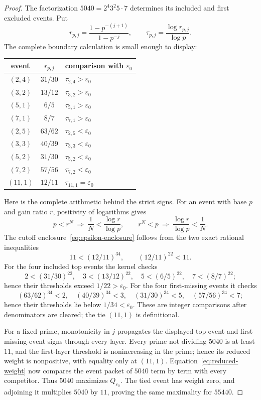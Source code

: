 \documentclass[11pt]{amsart}
\theoremstyle{definition}
\theoremstyle{remark}
\numberwithin{equation}{section}
\newcommand{\eps}{\varepsilon}
\begin{document}
\begin{proof}
The factorization $5040=2^4 3^2 5\cdot7$ determines its included and first
excluded events.  Put
\[
  r_{p,j}=\frac{1-p^{-(j+1)}}{1-p^{-j}},
  \qquad \tau_{p,j}=\frac{\log r_{p,j}}{\log p}.
\]
The complete boundary calculation is small enough to display:
\begin{center}
\begin{tabular}{@{}ccl@{}}
\toprule
event & $r_{p,j}$ & comparison with $\eps_0$ \\
\midrule
$(2,4)$ & $31/30$ & $\tau_{2,4}>\eps_0$ \\
$(3,2)$ & $13/12$ & $\tau_{3,2}>\eps_0$ \\
$(5,1)$ & $6/5$   & $\tau_{5,1}>\eps_0$ \\
$(7,1)$ & $8/7$   & $\tau_{7,1}>\eps_0$ \\
\midrule
$(2,5)$ & $63/62$ & $\tau_{2,5}<\eps_0$ \\
$(3,3)$ & $40/39$ & $\tau_{3,3}<\eps_0$ \\
$(5,2)$ & $31/30$ & $\tau_{5,2}<\eps_0$ \\
$(7,2)$ & $57/56$ & $\tau_{7,2}<\eps_0$ \\
$(11,1)$ & $12/11$ & $\tau_{11,1}=\eps_0$ \\
\bottomrule
\end{tabular}
\end{center}
Here is the complete arithmetic behind the strict signs.  For an event with
base $p$ and gain ratio $r$, positivity of logarithms gives
\[
 p<r^N\ \Longrightarrow\ \frac1N<\frac{\log r}{\log p},
 \qquad
 r^N<p\ \Longrightarrow\ \frac{\log r}{\log p}<\frac1N.
\]
The cutoff enclosure~\eqref{eq:epsilon-enclosure} follows from the two exact
rational inequalities
\[
 11<(12/11)^{34},\qquad (12/11)^{22}<11.
\]
For the four included top events the kernel checks
\[
 2<(31/30)^{22},\quad 3<(13/12)^{22},\quad
 5<(6/5)^{22},\quad 7<(8/7)^{22};
\]
hence their thresholds exceed $1/22>\eps_0$.  For the four first-missing
events it checks
\[
 (63/62)^{34}<2,\quad (40/39)^{34}<3,\quad
 (31/30)^{34}<5,\quad (57/56)^{34}<7;
\]
hence their thresholds lie below $1/34<\eps_0$.  These are integer
comparisons after denominators are cleared; the tie $(11,1)$ is definitional.

For a fixed prime, monotonicity in $j$ propagates the displayed top-event
and first-missing-event signs through every layer.  Every prime not dividing
$5040$ is at least $11$, and the first-layer threshold is nonincreasing in
the prime; hence its reduced weight is nonpositive, with equality only at
$(11,1)$.  Equation~\eqref{eq:reduced-weight} now compares the event packet
of $5040$ term by term with every competitor.  Thus $5040$ maximizes
$Q_{\eps_0}$.  The tied event has weight zero, and adjoining it multiplies
$5040$ by $11$, proving the same maximality for $55440$.
\end{proof}
\end{document}
